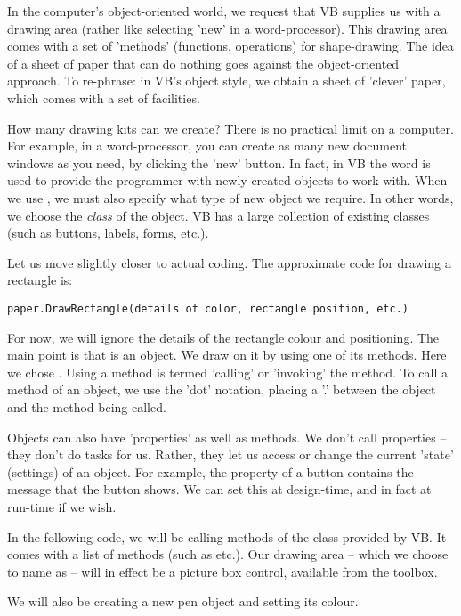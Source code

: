 		In the computer's object-oriented world, we request that VB supplies us with a drawing area (rather like selecting 'new' in a word-processor). This drawing area comes with a set of 'methods' (functions, operations) for shape-drawing. The idea of a sheet of paper that can do nothing goes against the object-oriented approach. To re-phrase: in VB's object style, we obtain a sheet of 'clever' paper, which comes with a set of facilities.

		How many drawing kits can we create? There is no practical limit on a computer. For example, in a word-processor, you can create as many new document windows as you need, by clicking the 'new' button. In fact, in VB the word  is used to provide the programmer with newly created objects to work with. When we use , we must also specify what type of new object we require. In other words, we choose the \emph{class} of the object. VB has a large collection of existing classes (such as buttons, labels, forms, etc.).

		Let us move slightly closer to actual coding. The approximate code for drawing a rectangle is:
		\begin{lstlisting}
paper.DrawRectangle(details of color, rectangle position, etc.)
		\end{lstlisting}

		For now, we will ignore the details of the rectangle colour and positioning. The main point is that  is an object. We draw on it by using one of its methods. Here we chose . Using a method is termed 'calling' or 'invoking' the method. To call a method of an object, we use the 'dot' notation, placing a '.' between the object and the method being called.

		Objects can also have 'properties' as well as methods. We don't call properties – they don't do tasks for us. Rather, they let us access or change the current 'state' (settings) of an object. For example, the  property of a button contains the message that the button shows. We can set this at design-time, and in fact at run-time if we wish.

		In the following code, we will be calling methods of the  class provided by VB. It comes with a list of methods (such as  etc.). Our drawing area – which we choose to name as  – will in effect be a picture box control, available from the toolbox.

		We will also be creating a new pen object and setting its colour.


